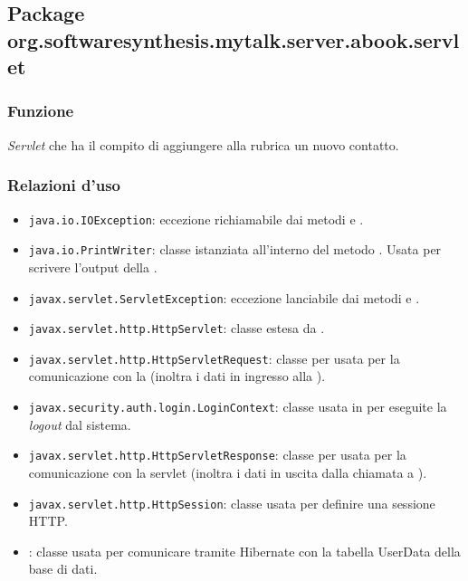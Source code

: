 \subsection{Package org.softwaresynthesis.mytalk.server.abook.servlet}\label{sec:call}



\subsubsection*{Funzione}
\textit{Servlet} che ha il compito di aggiungere alla rubrica un nuovo contatto.

\subsubsection*{Relazioni d'uso}

\begin{itemize}
	\item \texttt{java.io.IOException}: eccezione richiamabile dai metodi  e .
	\item \texttt{java.io.PrintWriter}: classe istanziata all'interno del metodo . Usata per scrivere l'output della .
	\item \texttt{javax.servlet.ServletException}: eccezione lanciabile dai metodi  e .
	\item \texttt{javax.servlet.http.HttpServlet}: classe estesa da .
	\item \texttt{javax.servlet.http.HttpServletRequest}:  classe per usata per la comunicazione con la  (inoltra i dati in ingresso alla ).
	\item \texttt{javax.security.auth.login.LoginContext}: classe usata in  per eseguite la \textit{logout} dal sistema.
	\item \texttt{javax.servlet.http.HttpServletResponse}: classe per usata per la comunicazione con la servlet (inoltra i dati in uscita dalla chiamata a ).
	\item \texttt{javax.servlet.http.HttpSession}: classe usata per definire una sessione HTTP.
	\item {}: classe usata per comunicare tramite Hibernate con la tabella UserData della base di dati.
\end{itemize}

